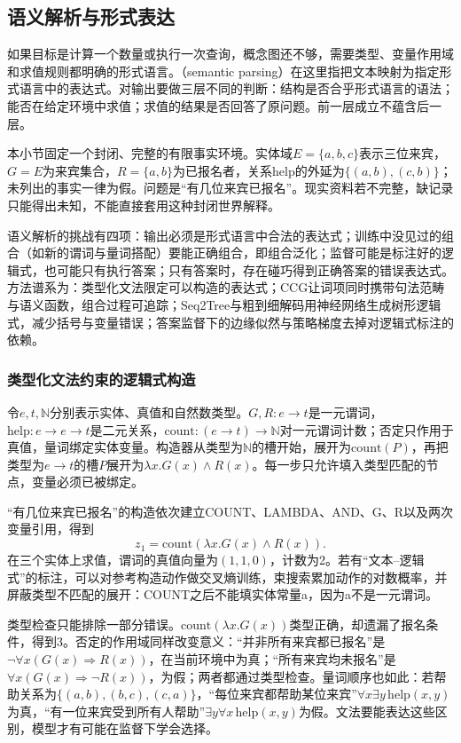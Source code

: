 \subsection{语义解析与形式表达}
\label{sec:nlp-analysis-formal}

如果目标是计算一个数量或执行一次查询，概念图还不够，需要类型、变量作用域和求值规则都明确的形式语言。（semantic parsing）在这里指把文本映射为指定形式语言中的表达式。对输出要做三层不同的判断：结构是否合乎形式语言的语法；能否在给定环境中求值；求值的结果是否回答了原问题。前一层成立不蕴含后一层。

本小节固定一个封闭、完整的有限事实环境。实体域$E=\{a,b,c\}$表示三位来宾，$G=E$为来宾集合，$R=\{a,b\}$为已报名者，关系$\mathrm{help}$的外延为$\{(a,b),(c,b)\}$；未列出的事实一律为假。问题是“有几位来宾已报名”。现实资料若不完整，缺记录只能得出未知，不能直接套用这种封闭世界解释。

语义解析的挑战有四项：输出必须是形式语言中合法的表达式；训练中没见过的组合（如新的谓词与量词搭配）要能正确组合，即组合泛化；监督可能是标注好的逻辑式，也可能只有执行答案；只有答案时，存在碰巧得到正确答案的错误表达式。方法谱系为：类型化文法限定可以构造的表达式；CCG让词项同时携带句法范畴与语义函数，组合过程可追踪；Seq2Tree与粗到细解码用神经网络生成树形逻辑式，减少括号与变量错误；答案监督下的边缘似然与策略梯度去掉对逻辑式标注的依赖。

\subsubsection{类型化文法约束的逻辑式构造}
\label{sec:nlp-analysis-typed-logic}

令$e,t,\mathbb N$分别表示实体、真值和自然数类型。$G,R:e\to t$是一元谓词，$\mathrm{help}:e\to e\to t$是二元关系，$\mathrm{count}:(e\to t)\to\mathbb N$对一元谓词计数；否定只作用于真值，量词绑定实体变量。构造器从类型为$\mathbb N$的槽开始，展开为$\mathrm{count}(P)$，再把类型为$e\to t$的槽$P$展开为$\lambda x.G(x)\land R(x)$。每一步只允许填入类型匹配的节点，变量必须已被绑定。

“有几位来宾已报名”的构造依次建立COUNT、LAMBDA、AND、G、R以及两次变量引用，得到
\[
 z_1=\mathrm{count}(\lambda x.G(x)\land R(x)).
\]
在三个实体上求值，谓词的真值向量为$(1,1,0)$，计数为2。若有“文本--逻辑式”的标注，可以对参考构造动作做交叉熵训练，束搜索累加动作的对数概率，并屏蔽类型不匹配的展开：COUNT之后不能填实体常量a，因为a不是一元谓词。

类型检查只能排除一部分错误。$\mathrm{count}(\lambda x.G(x))$类型正确，却遗漏了报名条件，得到3。否定的作用域同样改变意义：“并非所有来宾都已报名”是$\neg\forall x(G(x)\Rightarrow R(x))$，在当前环境中为真；“所有来宾均未报名”是$\forall x(G(x)\Rightarrow\neg R(x))$，为假；两者都通过类型检查。量词顺序也如此：若帮助关系为$\{(a,b),(b,c),(c,a)\}$，“每位来宾都帮助某位来宾”$\forall x\exists y\,\mathrm{help}(x,y)$为真，“有一位来宾受到所有人帮助”$\exists y\forall x\,\mathrm{help}(x,y)$为假。文法要能表达这些区别，模型才有可能在监督下学会选择。

